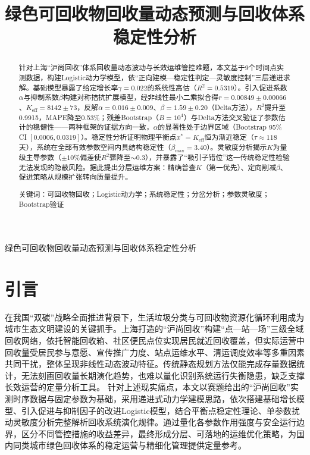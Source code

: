\documentclass[12pt,a4paper]{ctexart}
\title{
    \heiti 绿色可回收物回收量动态预测与回收体系稳定性分析
}
\begin{document}
\pagestyle{plain}

\begin{center}
    {\heiti 绿色可回收物回收量动态预测与回收体系稳定性分析}
\end{center}
\vspace{0.8em}

\begin{abstract}
{\kaishu
针对上海``沪尚回收''体系回收量动态波动与长效运维管控难题，本文基于9个时间点实测数据，构建Logistic动力学模型，依``正向建模—稳定性判定—灵敏度控制''三层递进求解。基础模型暴露了给定增长率$\gamma=0.022$的系统性高估（$R^2=0.5319$）。引入促进系数$\alpha$与抑制系数$\beta$构建对称拮抗扩展模型，经非线性最小二乘拟合得$r=0.00849\pm0.00066$、$K_{\text{eff}}=8142\pm73$，反解$\alpha=0.016\pm0.009$、$\beta=1.59\pm0.20$（Delta方法），$R^2$提升至0.9915，MAPE降至0.53\%；残差Bootstrap（$B=10^4$）与Delta方法交叉验证了参数估计的稳健性——两种框架的证据方向一致，$\alpha$的显著性处于边界区域（Bootstrap 95\% CI $[0.0006,0.0319]$）。稳定性分析证明物理平衡点$x^*=K_{\text{eff}}$恒为渐近稳定（$\tau\approx118$天），系统在全部有效参数空间内具结构稳定性（$\beta_{\max}=3.40$）。灵敏度分析揭示$K$为量级主导参数（$\pm10\%$偏差使$R^2$骤降至$\sim0.3$），并暴露了``吸引子错位''这一传统稳定性检验无法发现的隐蔽风险。据此提出分层运维方案：精确普查$K$（第一优先）、定向削减$\beta$、促进策略从规模扩张转向质量提升。

{\heiti 关键词}：可回收物回收；Logistic动力学；系统稳定性；分岔分析；参数灵敏度；Bootstrap验证
}
\end{abstract}

\newpage

\section{引言}
在我国“双碳”战略全面推进背景下，生活垃圾分类与可回收物资源化循环利用成为城市生态文明建设的关键抓手。上海打造的“沪尚回收”构建“点—站—场”三级全域回收网络，依托智能回收箱、社区便民点位实现居民就近回收覆盖，但实际运营中回收量受居民参与意愿、宣传推广力度、站点运维水平、清运调度效率等多重因素共同干扰，整体呈现非线性动态波动特征。传统静态规划方法仅能完成存量数据统计，无法刻画回收量长期演化趋势，也难以量化识别系统运行失衡隐患，缺乏支撑长效运营的定量分析工具。
针对上述现实痛点，本文以赛题给出的“沪尚回收”实测时序数据与固定参数为基础\cite{problem}，采用递进式动力学建模思路，依次搭建基础增长模型、引入促进与抑制因子的改进Logistic模型，结合平衡点稳定性理论、单参数扰动灵敏度分析完整解析回收系统演化规律。通过量化各参数作用强度与安全运行边界，区分不同管控措施的收益差异，最终形成分层、可落地的运维优化策略，为国内同类城市绿色回收体系的稳定运营与精细化管理提供定量参考。
\end{document}
